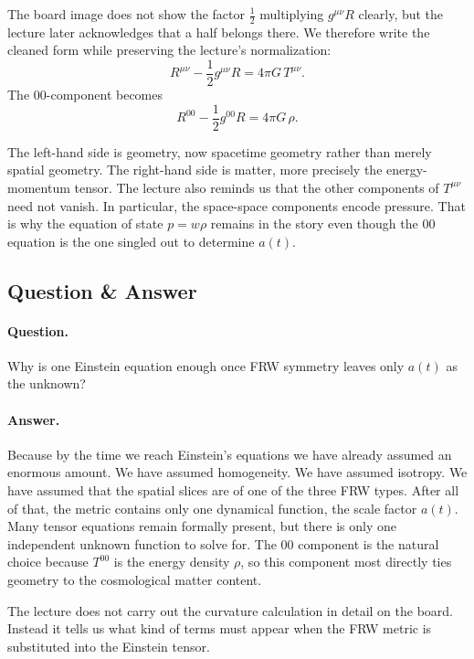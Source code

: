 The board image does not show the factor \(\tfrac12\) multiplying \(g^{\mu\nu}R\) clearly, but the lecture later acknowledges that a half belongs there. We therefore write the cleaned form while preserving the lecture's normalization:
\begin{equation}
R^{\mu\nu}-\frac{1}{2}g^{\mu\nu}R=4\pi G\,T^{\mu\nu}.
\end{equation}
The \(00\)-component becomes
\begin{equation}
R^{00}-\frac{1}{2}g^{00}R=4\pi G\,\rho.
\end{equation}

The left-hand side is geometry, now spacetime geometry rather than merely spatial geometry. The right-hand side is matter, more precisely the energy-momentum tensor. The lecture also reminds us that the other components of \(T^{\mu\nu}\) need not vanish. In particular, the space-space components encode pressure. That is why the equation of state \(p=w\rho\) remains in the story even though the \(00\) equation is the one singled out to determine \(a(t)\).

\subsection{Question \& Answer}

\paragraph{Question.} Why is one Einstein equation enough once FRW symmetry leaves only \(a(t)\) as the unknown?

\paragraph{Answer.} Because by the time we reach Einstein's equations we have already assumed an enormous amount. We have assumed homogeneity. We have assumed isotropy. We have assumed that the spatial slices are of one of the three FRW types. After all of that, the metric contains only one dynamical function, the scale factor \(a(t)\). Many tensor equations remain formally present, but there is only one independent unknown function to solve for. The \(00\) component is the natural choice because \(T^{00}\) is the energy density \(\rho\), so this component most directly ties geometry to the cosmological matter content.

The lecture does not carry out the curvature calculation in detail on the board. Instead it tells us what kind of terms must appear when the FRW metric is substituted into the Einstein tensor.

